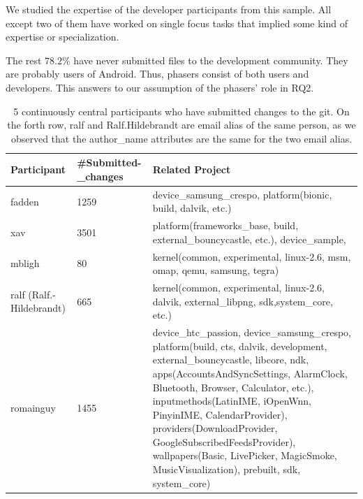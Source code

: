 \documentclass[conference]{IEEEtran}
\begin{document}
We studied the expertise of the developer participants from this
sample. All except two of them have worked on single focus tasks that
implied some kind of expertise or specialization.

The rest $78.2\%$ have never
submitted files to the development community. They are probably users
of Android. Thus, phasers consist of both users and
developers. This answers to our assumption of the phasers' role in RQ2.



\begin{table}[!t]
\caption{5 continuously central participants who have submitted changes to the git. On the forth row, ralf and Ralf.Hildebrandt are email alias of the same person, as we observed that the author\_name attributes are the same for the two email alias.}
\label{continuous_project}
\centering
\begin{tabular}{|p{1.2cm}|p{1.1cm}|p{4.6cm}|}
\hline
Participant & \#Submitted-\_changes & Related Project \\
\hline
fadden & 1259 & device\_samsung\_crespo, platform(bionic, build, dalvik, etc.) \\
\hline
xav & 3501 & platform(frameworks\_base, build, external\_bouncycastle, etc.), device\_sample, \\
\hline
mbligh & 80 & kernel(common, experimental, linux-2.6, msm, omap, qemu, samsung, tegra) \\
\hline
ralf (Ralf.-Hildebrandt) & 665 & kernel(common, experimental, linux-2.6, dalvik, external\_libpng, sdk,system\_core, etc.) \\
\hline
romainguy & 1455 & device\_htc\_passion, device\_samsung\_crespo, platform(build, cts, dalvik, development, external\_bouncycastle, libcore, ndk, apps(AccountsAndSyncSettings, AlarmClock,
Bluetooth, Browser, Calculator, etc.),
inputmethods(LatinIME, iOpenWnn, PinyinIME, CalendarProvider),
providers(DownloadProvider, GoogleSubscribedFeedsProvider), wallpapers(Basic, LivePicker,
MagicSmoke, MusicVisualization), prebuilt, sdk, system\_core) \\
\hline
\end{tabular}
\end{table}
\end{document}
